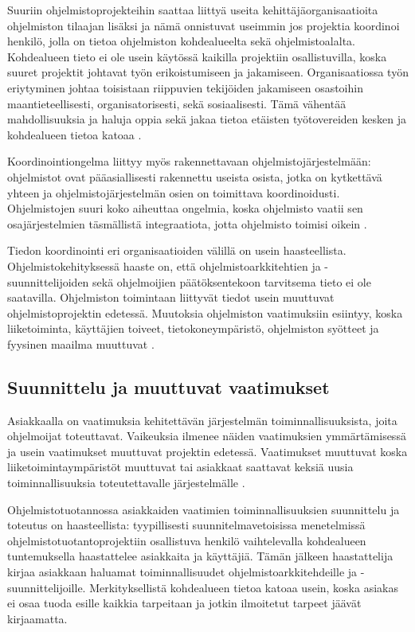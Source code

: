 \documentclass[finnish]{tktltiki2}
\theoremstyle{definition}
\theoremstyle{remark}
\begin{document}
Suuriin ohjelmistoprojekteihin saattaa liittyä useita kehittäjä\-organisaatioita ohjelmiston tilaajan lisäksi ja nämä onnistuvat useimmin jos projektia koordinoi henkilö, jolla on tietoa ohjelmiston kohdealueelta sekä ohjelmistoalalta. Kohdealueen tieto ei ole usein käytössä kaikilla projektiin osallistuvilla, koska suuret projektit johtavat työn erikoistumiseen ja jakamiseen. Organisaatiossa työn eriytyminen johtaa toisistaan riippuvien tekijöiden jakamiseen osastoihin maantieteellisesti, organisatorisesti, sekä sosiaalisesti. Tämä vähentää mahdollisuuksia ja haluja oppia sekä jakaa tietoa etäisten työtovereiden kesken ja kohdealueen tietoa katoaa \cite{KES95}.

Koordinointiongelma liittyy myös rakennettavaan ohjelmistojärjestelmään: ohjelmistot ovat pääasiallisesti rakennettu useista osista, jotka on kytkettävä yhteen ja ohjelmistojärjestelmän osien on toimittava koordinoidusti. Ohjelmistojen suuri koko aiheuttaa ongelmia, koska ohjelmisto vaatii sen osajärjestelmien täsmällistä integraatiota, jotta ohjelmisto toimisi oikein  \cite{KES95}.

Tiedon koordinointi eri organisaatioiden välillä on usein haasteellista. Ohjelmistokehityksessä haaste on, että ohjelmistoarkkitehtien ja -suunnittelijoiden sekä ohjelmoijien päätöksentekoon tarvitsema tieto ei ole saatavilla. Ohjelmiston toimintaan liittyvät tiedot usein muuttuvat ohjelmistoprojektin edetessä. Muutoksia ohjelmiston vaatimuksiin esiintyy, koska liiketoiminta, käyttäjien toiveet, tietokoneympäristö, ohjelmiston syötteet ja fyysinen maailma muuttuvat   \cite{KES95}.

\subsection{Suunnittelu ja muuttuvat vaatimukset}

Asiakkaalla on vaatimuksia kehitettävän järjestelmän toiminnallisuuksista, joita ohjelmoijat toteuttavat. Vaikeuksia ilmenee näiden vaatimuksien ymmärtämisessä ja usein vaatimukset muuttuvat projektin edetessä. Vaatimukset muuttuvat koska liiketoimintaympäristöt muuttuvat tai asiakkaat saattavat keksiä uusia toiminnallisuuksia toteutettavalle järjestelmälle \cite{FOW01a}.

Ohjelmistotuotannossa asiakkaiden vaatimien toiminnallisuuksien suunnittelu ja toteutus on haasteellista: tyypillisesti suunnitelmavetoisissa menetelmissä ohjelmistotuotantoprojektiin osallistuva henkilö vaihtelevalla kohdealueen tuntemuksella haastattelee asiakkaita ja käyttäjiä. Tämän jälkeen haastattelija kirjaa asiakkaan haluamat toiminnallisuudet ohjelmistoarkkitehdeille ja -suunnittelijoille. Merkityksellistä kohdealueen tietoa katoaa usein, koska asiakas ei osaa tuoda esille kaikkia tarpeitaan ja jotkin ilmoitetut tarpeet jäävät kirjaamatta.
\end{document}
